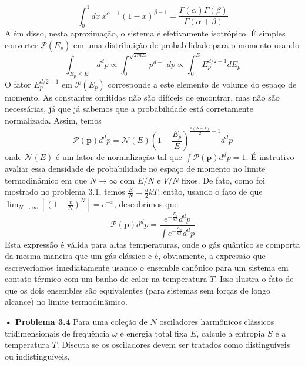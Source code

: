 \documentclass[12pt]{article}
\begin{document}
 \[
 \int_{0}^{1} dx \, x^{\alpha - 1} (1 - x)^{\beta - 1} = \frac{\Gamma(\alpha) \Gamma(\beta)}{\Gamma(\alpha + \beta)}
 \]
Além disso, nesta aproximação, o sistema é efetivamente isotrópico. É simples converter $\mathcal{P}(E_p)$ em uma distribuição de probabilidade para o momento usando 
 \[
 \int_{E_p \leq E'} d^d p \propto \int_{0}^{\sqrt{2mE}} p^{d-1} dp \propto \int_{0}^{E} E_p^{d/2 - 1} dE_p
 \]
 O fator $E_p^{d/2 - 1}$ em $\mathcal{P}(E_p)$ corresponde a este elemento de volume do espaço de momento. As constantes omitidas não são difíceis de encontrar, mas não são necessárias, já que já sabemos que a probabilidade está corretamente normalizada. Assim, temos 
 \[
 \mathcal{P}(\boldsymbol{p}) d^d p = \mathcal{N}(E) \left( 1 - \frac{E_p}{E} \right)^{\frac{d(N-1)}{2} - 1} d^d p
 \]
onde $\mathcal{N}(E)$ é um fator de normalização tal que $\int \mathcal{P}(\boldsymbol{p}) d^d p = 1$. É instrutivo avaliar essa densidade de probabilidade no espaço de momento no limite termodinâmico em que $N \rightarrow \infty$ com $E/N$ e $V/N$ fixos. De fato, como foi mostrado no problema 3.1, temos $\frac{E}{N} = \frac{d}{2} kT$; então, usando o fato de que$\lim_{N \to \infty} \left[ \left( 1 - \frac{x}{N} \right)^N \right] = e^{-x}$, descobrimos que 
 \[
 \mathcal{P}(\boldsymbol{p}) d^d p = \frac{e^{-\frac{E_p}{kT}} d^d p}{\int e^{-\frac{E_p}{kT}} d^d p}
 \]
 Esta expressão é válida para altas temperaturas, onde o gás quântico se comporta da mesma maneira que um gás clássico e é, obviamente, a expressão que escreveríamos imediatamente usando o ensemble canônico para um sistema em contato térmico com um banho de calor na temperatura $T$. Isso ilustra o fato de que os dois ensembles são equivalentes (para sistemas sem forças de longo alcance) no limite termodinâmico. 
 
\textbf{• Problema 3.4} Para uma coleção de $N$ osciladores harmônicos clássicos tridimensionais de frequência $\omega$ e energia total fixa $E$, calcule a entropia $S$ e a temperatura $T$. Discuta se os osciladores devem ser tratados como distinguíveis ou indistinguíveis.
\end{document}
